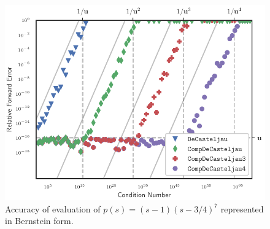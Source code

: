 \begin{figure}
  \includegraphics{../images/k-compensated/de_casteljau_rel_error.pdf}
  \centering
  \captionsetup{width=.75\linewidth}
  \caption{Accuracy of evaluation of \(p(s) = (s - 1)\left(s - 3/4\right)^7\)
    represented in Bernstein form.}
  \label{fig:compensated-k}
\end{figure}

